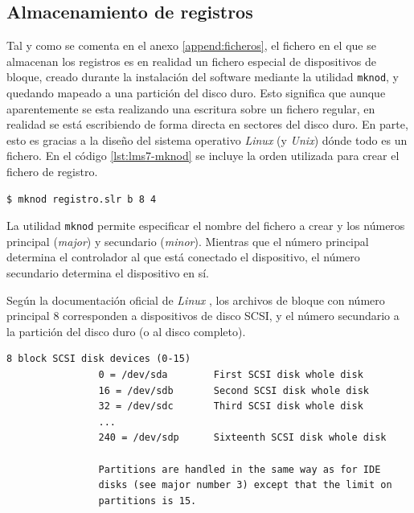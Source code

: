 \subsection{Almacenamiento de registros}

Tal y como se comenta en el anexo \ref{append:ficheros}, el fichero en el que se almacenan los registros es en realidad un fichero especial de dispositivos de bloque, creado durante la instalación del software mediante la utilidad \verb|mknod|, y quedando mapeado a una partición del disco duro. Esto significa que aunque aparentemente se esta realizando una escritura sobre un fichero regular, en realidad se está escribiendo de forma directa en sectores del disco duro. En parte, esto es gracias a la diseño del sistema operativo \textit{Linux} (y \textit{Unix}) dónde todo es un fichero. En el código \ref{lst:lms7-mknod} se incluye la orden utilizada para crear el fichero de registro. \\

\begin{lstlisting}[language=bash, caption={Creación del fichero de registro como un fichero especial de bloques.}, label={lst:lms7-mknod}]
	$ mknod registro.slr b 8 4
\end{lstlisting}

\begin{shaded}
    \noindent
    La utilidad \verb|mknod| permite especificar el nombre del fichero a crear y los números principal (\textit{major}) y secundario (\textit{minor}). Mientras que el número principal determina el controlador al que está conectado el dispositivo, el número secundario determina el dispositivo en sí.
\end{shaded}

Según la documentación oficial de \textit{Linux} \cite{linux-devices}, los archivos de bloque con número principal 8 corresponden a dispositivos de disco \acrshort{SCSI}, y el número secundario a la partición del disco duro (o al disco completo). \\

\begin{lstlisting}[caption={Descripción de los ficheros con \textit{major number} 8.}]
	8 block	SCSI disk devices (0-15)
				0 = /dev/sda		First SCSI disk whole disk
				16 = /dev/sdb		Second SCSI disk whole disk
				32 = /dev/sdc		Third SCSI disk whole disk
				...
				240 = /dev/sdp		Sixteenth SCSI disk whole disk

				Partitions are handled in the same way as for IDE
				disks (see major number 3) except that the limit on
				partitions is 15.
\end{lstlisting}


